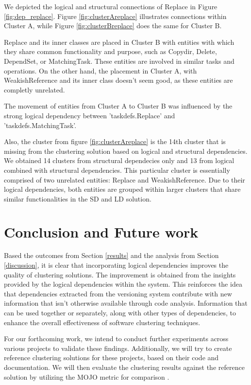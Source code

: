 \documentclass[conference]{IEEEtran}
\begin{document}
We depicted the logical and structural connections of Replace in Figure \ref{fig:dep_replace}. Figure \ref{fig:clusterAreplace} illustrates connections within Cluster A, while Figure \ref{fig:clusterBreplace} does the same for Cluster B.

Replace and its inner classes are placed in Cluster B with entities with which they share common functionality and purpose, such as Copydir, Delete, DependSet, or MatchingTask. These entities are involved in similar tasks and operations. On the other hand, the placement in Cluster A, with WeakishReference and its inner class doesn't seem good, as these entities are completly unrelated.  

The movement of entities from Cluster A to Cluster B was influenced by the strong logical dependency between 'taskdefs.Replace' and 'taskdefs.MatchingTask'.


Also, the cluster from figure \ref{fig:clusterAreplace} is the 14th cluster that is missing from the clustering solution based on logical and structural dependencies. We obtained 14 clusters from structural dependecies only and 13 from logical combined with structural dependencies. This particular cluster is essentially comprised of two unrelated entities: Replace and WeakishReference. Due to their logical dependencies, both entities are grouped within larger clusters that share similar functionalities in the SD and LD solution.



\section{Conclusion and Future work}
\label{conclusion}

Based the outcomes from Section \ref{results} and the analysis from Section \ref{discussion}, it is clear that incorporating logical dependencies improves the quality of clustering solutions. 
The improvement is obtained from the insights provided by the logical dependencies within the system. This reinforces the idea that dependencies extracted from the versioning system contribute with new information that isn't otherwise available through code analysis. Information that can be used together or separately, along with other types of dependencies, to enhance the overall effectiveness of software clustering techniques.

For our forthcoming work, we intend to conduct further experiments across various projects to validate these findings. Additionally, we will try to create reference clustering solutions for these projects, based on their code and documentation. We will then evaluate the clustering results against the reference solution by utilizing the MOJO metric for comparison \cite{mojo-tzerpos}.




\end{document}
